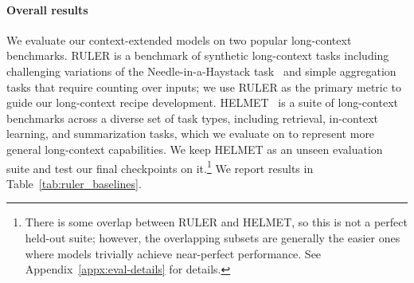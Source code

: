 \documentclass[table]{ai2style/ai2}
\begin{document}
\paragraph{Overall results}  We evaluate our context-extended models on two popular long-context benchmarks.
RULER \citep{hsieh2024rulerwhatsrealcontext} is a benchmark of synthetic long-context tasks including challenging variations of the Needle-in-a-Haystack task~\citep{nelson2024needlehaystackmemorybased} and simple aggregation tasks that require counting over inputs; we use RULER as the primary metric to guide our long-context recipe development.
HELMET~\citep{yen2025helmet} is a suite of long-context benchmarks across a diverse set of task types, including retrieval, in-context learning, and summarization tasks, which we evaluate on to represent more general long-context capabilities.  We keep HELMET as an unseen evaluation suite and test our final checkpoints on it.\footnote{There is some overlap between RULER and HELMET, so this is not a perfect held-out suite; however, the overlapping subsets are generally the easier ones where models trivially achieve near-perfect performance. See Appendix~\ref{appx:eval-details} for details.} 
We report results in Table~\ref{tab:ruler_baselines}.
\end{document}
